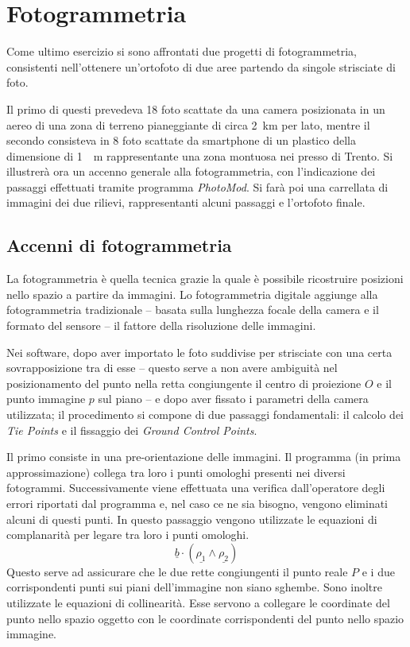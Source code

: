 \chapter{Fotogrammetria}
Come ultimo esercizio si sono affrontati due progetti di fotogrammetria, consistenti nell'ottenere un'ortofoto di due aree partendo da singole strisciate di foto.

Il primo di questi prevedeva 18 foto scattate da una camera posizionata in un aereo di una zona di terreno pianeggiante di circa \SI{2}{\kilo\meter} per lato, mentre il secondo consisteva in 8 foto scattate da smartphone di un plastico della dimensione di \SI{1}{\squared\meter} rappresentante una zona montuosa nei presso di Trento.
Si illustrerà ora un accenno generale alla fotogrammetria, con l'indicazione dei passaggi effettuati tramite programma \emph{PhotoMod}. 
Si farà poi una carrellata di immagini dei due rilievi, rappresentanti alcuni passaggi e l'ortofoto finale. 

\section{Accenni di fotogrammetria}
La fotogrammetria è quella tecnica grazie la quale è possibile ricostruire posizioni nello spazio a partire da immagini.
Lo fotogrammetria digitale aggiunge alla fotogrammetria tradizionale -- basata sulla lunghezza focale della camera e il formato del sensore -- il fattore della risoluzione delle immagini.

Nei software, dopo aver importato le foto suddivise per strisciate con una certa sovrapposizione tra di esse -- questo serve a non avere ambiguità nel posizionamento del punto nella retta congiungente il centro di proiezione $O$ e il punto immagine $p$ sul piano -- e dopo aver fissato i parametri della camera utilizzata; il procedimento si compone di due passaggi fondamentali: il calcolo dei \textit{Tie Points} e il fissaggio dei \textit{Ground Control Points}.

Il primo consiste in una pre-orientazione delle immagini. 
Il programma (in prima approssimazione) collega tra loro i punti omologhi presenti nei diversi fotogrammi.
Successivamente viene effettuata una verifica dall'operatore degli errori riportati dal programma e, nel caso ce ne sia bisogno, vengono eliminati alcuni di questi punti.
In questo passaggio vengono utilizzate le equazioni di complanarità per legare tra loro i punti omologhi. 
\begin{equation}
	\underline{b}\cdot\left(\underline{\rho_1}\wedge\underline{\rho_2}\right)
\end{equation}
Questo serve ad assicurare che le due rette congiungenti il punto reale $P$ e i due corrispondenti punti sui piani dell'immagine non siano sghembe.
Sono inoltre utilizzate le equazioni di collinearità. 
Esse servono a collegare le coordinate del punto nello spazio oggetto con le coordinate corrispondenti del punto nello spazio immagine.
 

